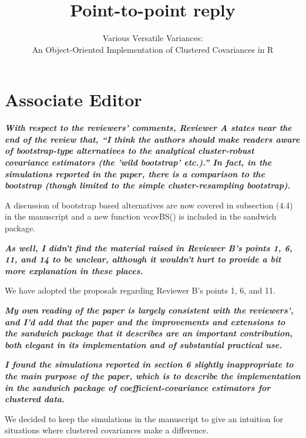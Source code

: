 \documentclass[10pt,a4paper]{article}
\begin{document}
\title{Point-to-point reply}
\author{Various Versatile Variances:\\ An Object-Oriented Implementation of Clustered Covariances in R}
\date{}
\maketitle

\section*{Associate Editor}

\textbf{\textit{With respect to the reviewers' comments, Reviewer A states near the end of
the review that, ``I think the authors should make readers aware of
bootstrap-type alternatives to the analytical cluster-robust covariance
estimators (the 'wild bootstrap' etc.).'' In fact, in the simulations
reported in the paper, there is a comparison to the bootstrap (though
limited to the simple cluster-resampling bootstrap).}}

\medskip

A discussion of bootstrap based alternatives are now covered in subsection (4.4) in the manuscript and a new function vcovBS() is included in the sandwich package.

\medskip

\textbf{\textit{As well, I didn't find the material raised in Reviewer B's points 1, 6, 11,
and 14 to be unclear, although it wouldn't hurt to provide a bit more
explanation in these places.}}

\medskip

We have adopted the proposals regarding Reviewer B's points 1, 6, and 11.

\medskip

\textbf{\textit{My own reading of the paper is largely consistent with the reviewers', and
I'd add that the paper and the improvements and extensions to the sandwich
package that it describes are an important contribution, both elegant in its
implementation and of substantial practical use.}}

\medskip

\textbf{\textit{I found the simulations reported in section 6 slightly inappropriate to the
main purpose of the paper, which is to describe the implementation in the
sandwich package of coefficient-covariance estimators for clustered data.}}

\medskip

We decided to keep the simulations in the manuscript to give an intuition for situations where clustered covariances make a difference.
\end{document}
